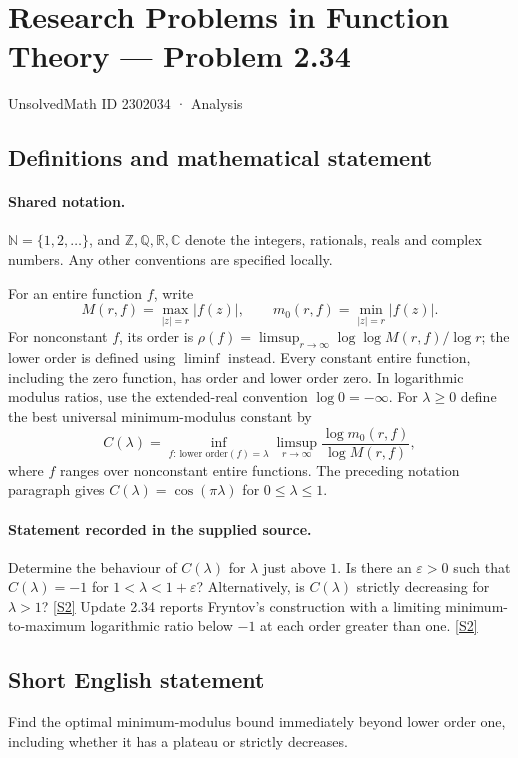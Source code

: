 \documentclass[11pt]{article}
\newcommand{\sref}[2]{\hyperlink{source:#1:#2}{[S#2]}}
\begin{document}
\setcounter{section}{2302033}
\section{Research Problems in Function Theory — Problem 2.34}\label{2302034}
{\small\sffamily UnsolvedMath ID 2302034 · Analysis}
\subsection{Definitions and mathematical statement}

\paragraph{Shared notation.}$\mathbb N=\{1,2,\ldots\}$, and $\mathbb Z,\mathbb Q,\mathbb R,\mathbb C$ denote the integers, rationals, reals and complex numbers. Any other conventions are specified locally.


For an entire function $f$, write
\[
 M(r,f)=\max_{|z|=r}|f(z)|,\qquad m_0(r,f)=\min_{|z|=r}|f(z)|.
\]
For nonconstant $f$, its order is $\rho(f)=\limsup_{r\to\infty}\log\log M(r,f)/\log r$;
the lower order is defined using $\liminf$ instead. Every constant entire function, including the zero function, has order and lower order zero. In logarithmic modulus ratios, use the extended-real convention $\log0=-\infty$.
For $\lambda\ge0$ define the best universal minimum-modulus constant by
\[C(\lambda)=\inf_{f:\,\text{lower order}(f)=\lambda}
\limsup_{r\to\infty}\frac{\log m_0(r,f)}{\log M(r,f)},\]
where $f$ ranges over nonconstant entire functions. The preceding notation paragraph gives $C(\lambda)=\cos(\pi\lambda)$ for $0\le\lambda\le1$.

\paragraph{Statement recorded in the supplied source.}
Determine the behaviour of $C(\lambda)$ for $\lambda$ just above $1$. Is there an $\varepsilon>0$ such that $C(\lambda)=-1$ for $1<\lambda<1+\varepsilon$? Alternatively, is $C(\lambda)$ strictly decreasing for $\lambda>1$? \sref{2302034}{2}
Update 2.34 reports Fryntov's construction with a limiting minimum-to-maximum logarithmic ratio below $-1$ at each order greater than one. \sref{2302034}{2}
\subsection{Short English statement}
Find the optimal minimum-modulus bound immediately beyond lower order one, including whether it has a plateau or strictly decreases.
\end{document}
